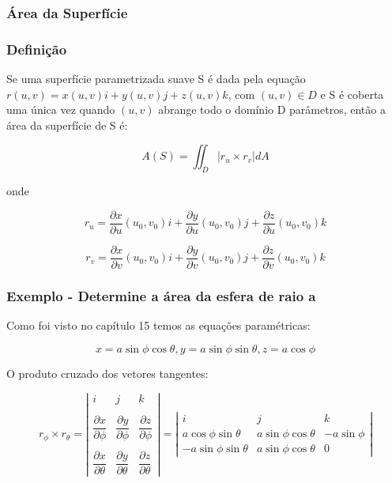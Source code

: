 \documentclass[12pt]{article}
\begin{document}
\subsubsection*{Área da Superfície}
\subsubsection*{Definição}
Se uma superfície parametrizada suave S é dada pela equação $r(u, v) = x(u, v)i + y(u, v)j + z(u, v)k$, com $(u, v) \in D$ e S é coberta uma única vez quando $(u, v)$ abrange todo o domínio D parâmetros, então a área da superfície de S é:

$$A(S) = \iint_D |r_u \times r_v| dA$$

onde 

$$r_u = \dfrac{\partial x}{\partial u}(u_0, v_0)i + \dfrac{\partial y}{\partial u}(u_0, v_0)j + \dfrac{\partial z}{\partial u}(u_0, v_0)k$$ 

$$r_v = \dfrac{\partial x}{\partial v}(u_0, v_0)i + \dfrac{\partial y}{\partial v}(u_0, v_0)j + \dfrac{\partial z}{\partial v}(u_0, v_0)k$$

\subsubsection*{Exemplo - Determine a área da esfera de raio a}

Como foi visto no capítulo 15 temos as equações paramétricas:

$$ x = a \sin{\phi} \cos{\theta}, y = a \sin{\phi} \sin{\theta}, z = a \cos{\phi}$$

O produto cruzado dos vetores tangentes:

$$r_\phi \times r_\theta = \left| \begin{array}{rcr}
i & j  & k \\\\
 \dfrac{\partial x}{\partial \phi} & \dfrac{\partial y}{\partial \phi} & \dfrac{\partial z}{\partial \phi}\\\\
 \dfrac{\partial x}{\partial \theta} & \dfrac{\partial y}{\partial \theta}  & \dfrac{\partial z}{\partial \theta}
\end{array} \right| = \left| \begin{array}{rcr}
i & j  & k \\ 
 a \cos{\phi} \sin{\theta} & a \sin{\phi} \cos{\theta} & -a \sin{\phi}\\
 -a \sin{\phi} \sin{\theta} & a \sin{\phi} \cos{\theta}  & 0
\end{array} \right|$$
\end{document}
